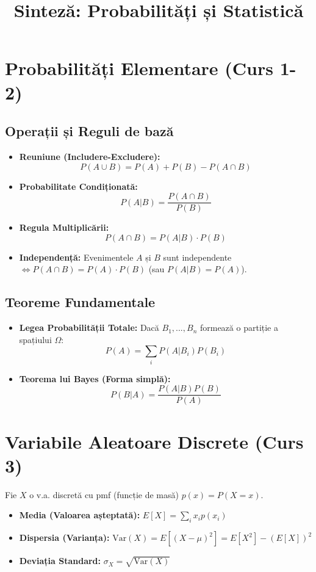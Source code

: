 \documentclass[12pt, a4paper]{article}
\title{\textbf{Sinteză: Probabilități și Statistică}}
\author{}
\date{}
\begin{document}
\maketitle

\section{Probabilități Elementare (Curs 1-2)}

\subsection*{Operații și Reguli de bază}
\begin{itemize}
    \item \textbf{Reuniune (Includere-Excludere):} 
    \[ P(A \cup B) = P(A) + P(B) - P(A \cap B) \]
    \item \textbf{Probabilitate Condiționată:} 
    \[ P(A|B) = \frac{P(A \cap B)}{P(B)} \]
    \item \textbf{Regula Multiplicării:} 
    \[ P(A \cap B) = P(A|B) \cdot P(B) \]
    \item \textbf{Independență:} Evenimentele $A$ și $B$ sunt independente $\iff P(A \cap B) = P(A) \cdot P(B)$ (sau $P(A|B) = P(A)$).
\end{itemize}

\subsection*{Teoreme Fundamentale}
\begin{itemize}
    \item \textbf{Legea Probabilității Totale:} Dacă $B_1, ..., B_n$ formează o partiție a spațiului $\Omega$:
    \[ P(A) = \sum_{i} P(A|B_i)P(B_i) \]
    \item \textbf{Teorema lui Bayes (Forma simplă):}
    \[ P(B|A) = \frac{P(A|B)P(B)}{P(A)} \]
\end{itemize}

\hrulefill

\section{Variabile Aleatoare Discrete (Curs 3)}
Fie $X$ o v.a. discretă cu pmf (funcție de masă) $p(x) = P(X=x)$.

\begin{itemize}
    \item \textbf{Media (Valoarea așteptată):} $E[X] = \sum_{i} x_i p(x_i)$
    \item \textbf{Dispersia (Varianța):} $\text{Var}(X) = E[(X - \mu)^2] = E[X^2] - (E[X])^2$
    \item \textbf{Deviația Standard:} $\sigma_X = \sqrt{\text{Var}(X)}$
\end{itemize}
\end{document}
